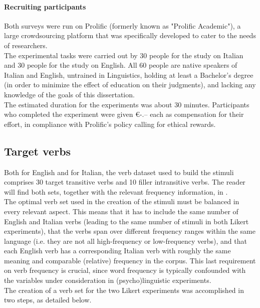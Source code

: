 \paragraph{Recruiting participants} Both surveys were run on Prolific (formerly known as "Prolific Academic"), a large crowdsourcing platform that was specifically developed to cater to the needs of researchers.\\
The experimental tasks were carried out by 30 people for the study on Italian and 30 people for the study on English. All 60 people are native speakers of Italian and English, untrained in Linguistics, holding at least a Bachelor's degree (in order to minimize the effect of education on their judgments), and lacking any knowledge of the goals of this dissertation.\\
The estimated duration for the experiments was about 30 minutes. Participants who completed the experiment were given €-.-- each as compensation for their effort, in compliance with Prolific's policy calling for ethical rewards.


\subsection{Target verbs} 
Both for English and for Italian, the verb dataset used to build the stimuli comprises 30 target transitive verbs and 10 filler intransitive verbs. The reader will find both sets, together with the relevant frequency information, in .\\
The optimal verb set used in the creation of the stimuli must be balanced in every relevant aspect. This means that it has to include the same number of English and Italian verbs (leading to the same number of stimuli in both Likert experiments), that the verbs span over different frequency ranges within the same language (i.e. they are not all high-frequency or low-frequency verbs), and that each English verb has a corresponding Italian verb with roughly the same meaning and comparable (relative) frequency in the corpus. This last requirement on verb frequency is crucial, since word frequency is typically confounded with the variables under consideration in (psycho)linguistic experiments.\\
The creation of a verb set for the two Likert experiments was accomplished in two steps, as detailed below.


